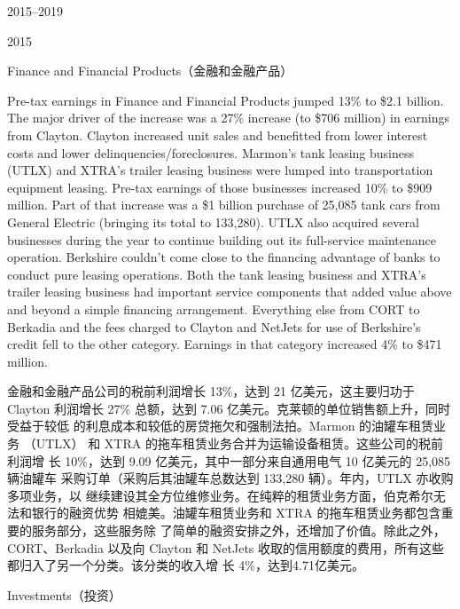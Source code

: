 \begin{chapter}{2015--2019}
\begin{section}{2015}
\begin{subsection}{Finance and Financial Products（金融和金融产品）}
\begin{verseparallel}
  {
    Pre-tax earnings in Finance and Financial Products jumped 13\% to \$2.1
    billion. The major driver of the increase was a 27\% increase (to \$706
    million) in earnings from Clayton. Clayton increased unit sales and
    benefitted from lower interest costs and lower delinquencies/foreclosures.
    Marmon’s tank leasing business (UTLX) and XTRA’s trailer leasing business
    were lumped into transportation equipment leasing. Pre-tax earnings of those
    businesses increased 10\% to \$909 million. Part of that increase was a \$1
    billion purchase of 25,085 tank cars from General Electric (bringing its
    total to 133,280). UTLX also acquired several businesses during the year to
    continue building out its full-service maintenance operation. Berkshire
    couldn’t come close to the financing advantage of banks to conduct pure
    leasing operations. Both the tank leasing business and XTRA’s trailer
    leasing business had important service components that added value above and
    beyond a simple financing arrangement. Everything else from CORT to Berkadia
    and the fees charged to Clayton and NetJets for use of Berkshire’s credit
    fell to the other category. Earnings in that category increased 4\% to \$471
    million. \\
  }
  {

    金融和金融产品公司的税前利润增长 13\%，达到 21 亿美元，这主要归功于 Clayton
    利润增长 27\% 总额，达到 7.06 亿美元。克莱顿的单位销售额上升，同时受益于较低
    的利息成本和较低的房贷拖欠和强制法拍。Marmon 的油罐车租赁业务
    （UTLX） 和 XTRA 的拖车租赁业务合并为运输设备租赁。这些公司的税前利润增
    长 10\%，达到 9.09 亿美元，其中一部分来自通用电气 10 亿美元的 25,085 辆油罐车
    采购订单（采购后其油罐车总数达到 133,280 辆）。年内，UTLX 亦收购多项业务，以
    继续建设其全方位维修业务。在纯粹的租赁业务方面，伯克希尔无法和银行的融资优势
    相媲美。油罐车租赁业务和 XTRA 的拖车租赁业务都包含重要的服务部分，这些服务除
    了简单的融资安排之外，还增加了价值。除此之外，CORT、Berkadia 以及向 Clayton
    和 NetJets 收取的信用额度的费用，所有这些都归入了另一个分类。该分类的收入增
    长 4\%，达到4.71亿美元。

  }
\end{verseparallel}
\end{subsection}

\begin{subsection}{Investments（投资）}
\begin{verseparallel}
  {

}
\end{verseparallel}
\end{subsection}
\end{section}
\end{chapter}
